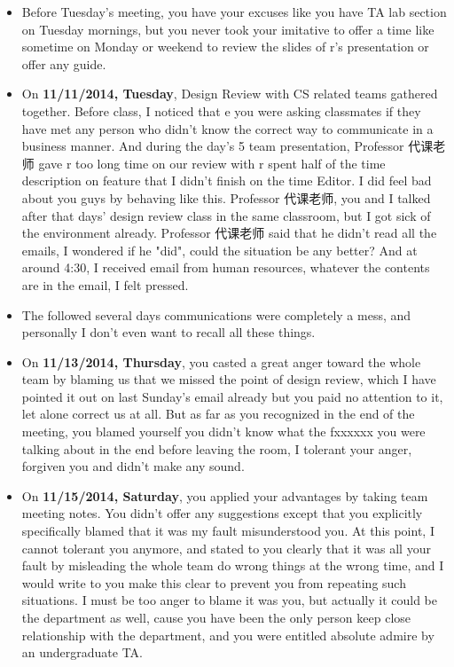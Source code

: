 \documentclass[9pt,b5paper]{article}
\begin{document}
\begin{itemize}
\item Before Tuesday's meeting, you have your excuses like you have TA lab section on Tuesday mornings, but you never took your imitative to offer a time like sometime on Monday or weekend to review the slides of r's presentation or offer any guide.

\item On \textbf{11/11/2014, Tuesday}, Design Review with CS related teams gathered together. Before class, I noticed that e you were asking classmates if they have met any person who didn't know the correct way to communicate in a business manner. And during the day's 5 team presentation, Professor 代课老师 gave r too long time on our review with r spent half of the time description on feature that I didn't finish on the time Editor. I did feel bad about you guys by behaving like this. Professor 代课老师, you and I talked after that days' design review class in the same classroom, but I got sick of the environment already. Professor 代课老师 said that he didn't read all the emails, I wondered if he "did", could the situation be any better? And at around 4:30, I received email from human resources, whatever the contents are in the email, I felt pressed.

\item The followed several days communications were completely a mess, and personally I don't even want to recall all these things.

\item On \textbf{11/13/2014, Thursday}, you casted a great anger toward the whole team by blaming us that we missed the point of design review, which I have pointed it out on last Sunday's email already but you paid no attention to it, let alone correct us at all. But as far as you recognized in the end of the meeting, you blamed yourself you didn't know what the fxxxxxx you were talking about in the end before leaving the room, I tolerant your anger, forgiven you and didn't make any sound.

\item On \textbf{11/15/2014, Saturday}, you applied your advantages by taking team meeting notes. You didn't offer any suggestions except that you explicitly specifically blamed that it was my fault misunderstood you. At this point, I cannot tolerant you anymore, and stated to you clearly that it was all your fault by misleading the whole team do wrong things at the wrong time, and I would write to you make this clear to prevent you from repeating such situations. I must be too anger to blame it was you, but actually it could be the department as well, cause you have been the only person keep close relationship with the department, and you were entitled absolute admire by an undergraduate TA.
\end{itemize}
\end{document}
